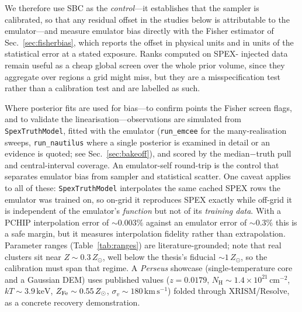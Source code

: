 \documentclass[11pt,a4paper]{article}
\newcommand{\nh}{N_{\mathrm{H}}}
\newcommand{\kev}{\,\mathrm{keV}}
\newcommand{\kms}{\,\mathrm{km\,s^{-1}}}
\newcommand{\zsun}{Z_\odot}
\newcommand{\code}[1]{\texttt{#1}}
\begin{document}
We therefore use SBC as the \emph{control}---it establishes that the sampler is
calibrated, so that any residual offset in the studies below is attributable to
the emulator---and measure emulator bias directly with the Fisher estimator of
Sec.~\ref{sec:fisherbias}, which reports the offset in physical units and in
units of the statistical error at a stated exposure. Ranks computed on SPEX-
injected data remain useful as a cheap global screen over the whole prior
volume, since they aggregate over regions a grid might miss, but they are a
misspecification test rather than a calibration test and are labelled as such.

Where posterior fits are used for bias---to confirm points the Fisher screen
flags, and to validate the linearisation---observations are simulated from
\code{SpexTruthModel}, fitted with the emulator (\code{run\_emcee} for the
many-realisation sweeps, \code{run\_nautilus} where a single posterior is
examined in detail or an evidence is quoted; see Sec.~\ref{sec:bakeoff}), and scored by the
median$-$truth pull and central-interval coverage. An emulator-self round-trip
is the control that separates emulator bias from sampler and statistical
scatter. One caveat applies to all of these: \code{SpexTruthModel} interpolates
the same cached SPEX rows the emulator was trained on, so on-grid it reproduces
SPEX exactly while off-grid it is independent of the emulator's \emph{function}
but not of its \emph{training data}. With a PCHIP interpolation error of
${\sim}0.003\%$ against an emulator error of ${\sim}0.3\%$ this is a safe
margin, but it measures interpolation fidelity rather than extrapolation.
Parameter ranges (Table~\ref{tab:ranges}) are
literature-grounded; note that real clusters sit near $Z\sim0.3\,\zsun$, well
below the thesis's fiducial $\sim1\,\zsun$, so the calibration must span that
regime. A \emph{Perseus} showcase (single-temperature core and a Gaussian DEM)
uses published values ($z=0.0179$, $\nh\sim1.4\times10^{21}\,\mathrm{cm^{-2}}$,
$kT\sim3.9\kev$, $Z_{\rm Fe}\sim0.55\,\zsun$, $\sigma_v\sim180\kms$) folded
through XRISM/Resolve, as a concrete recovery demonstration.
\end{document}
